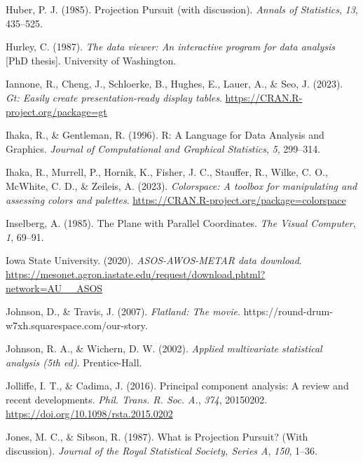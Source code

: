 \documentclass[
  letterpaper,
]{krantz}
\newlength{\cslhangindent}
\newlength{\cslentryspacingunit} %
\newenvironment{CSLReferences}[2] %
 {%
  \setlength{\parindent}{0pt}
  \ifodd #1
  \let\oldpar\par
  \def\par{\hangindent=\cslhangindent\oldpar}
  \fi
  \setlength{\parskip}{#2\cslentryspacingunit}
 }%
 {}
\begin{document}
\begin{CSLReferences}{1}{0}
\leavevmode{}%
Huber, P. J. (1985). {P}rojection {P}ursuit (with discussion).
\emph{Annals of Statistics}, \emph{13}, 435--525.

\leavevmode{}%
Hurley, C. (1987). \emph{The data viewer: An interactive program for
data analysis} {[}PhD thesis{]}. University of Washington.

\leavevmode{}%
Iannone, R., Cheng, J., Schloerke, B., Hughes, E., Lauer, A., \& Seo, J.
(2023). \emph{Gt: Easily create presentation-ready display tables}.
\url{https://CRAN.R-project.org/package=gt}

\leavevmode{}%
Ihaka, R., \& Gentleman, R. (1996). R: {A} {L}anguage for {D}ata
{A}nalysis and {G}raphics. \emph{Journal of Computational and Graphical
Statistics}, \emph{5}, 299--314.

\leavevmode{}%
Ihaka, R., Murrell, P., Hornik, K., Fisher, J. C., Stauffer, R., Wilke,
C. O., McWhite, C. D., \& Zeileis, A. (2023). \emph{Colorspace: A
toolbox for manipulating and assessing colors and palettes}.
\url{https://CRAN.R-project.org/package=colorspace}

\leavevmode{}%
Inselberg, A. (1985). {T}he {P}lane with {P}arallel {C}oordinates.
\emph{The Visual Computer}, \emph{1}, 69--91.

\leavevmode{}%
Iowa State University. (2020). \emph{ASOS-AWOS-METAR data download}.
\url{https://mesonet.agron.iastate.edu/request/download.phtml?network=AU__ASOS}

\leavevmode{}%
Johnson, D., \& Travis, J. (2007). \emph{Flatland: The movie}.
https://round-drum-w7xh.squarespace.com/our-story.

\leavevmode{}%
Johnson, R. A., \& Wichern, D. W. (2002). \emph{Applied multivariate
statistical analysis (5th ed)}. Prentice-Hall.

\leavevmode{}%
Jolliffe, I. T., \& Cadima, J. (2016). Principal component analysis: A
review and recent developments. \emph{Phil. Trans. R. Soc. A.},
\emph{374}, 20150202. \url{https://doi.org/10.1098/rsta.2015.0202}

\leavevmode{}%
Jones, M. C., \& Sibson, R. (1987). {W}hat is {P}rojection {P}ursuit?
(With discussion). \emph{Journal of the Royal Statistical Society,
Series A}, \emph{150}, 1--36.


\end{CSLReferences}
\end{document}
